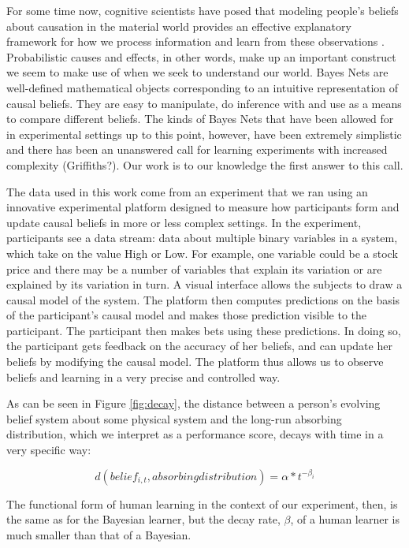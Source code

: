 For some time now, cognitive scientists have posed that modeling people's beliefs about causation in the material world provides an effective explanatory framework for how we process information and learn from these observations \cite{Griffiths2008}.  Probabilistic causes and effects, in other words, make up an important construct we seem to make use of when we seek to understand our world.  Bayes Nets are well-defined mathematical objects corresponding to an intuitive representation of causal beliefs.  They are easy to manipulate, do inference with and use as a means to compare different beliefs.  The kinds of Bayes Nets that have been allowed for in experimental settings up to this point, however, have been extremely simplistic and there has been an unanswered call for learning experiments with increased complexity (Griffiths?).  Our work is to our knowledge the first answer to this call.  

The data used in this work come from an experiment that we ran using an innovative experimental platform designed to measure how participants form and update causal beliefs in more or less complex settings.  In the experiment, participants see a data stream: data about multiple binary variables in a system, which take on the value High or Low. For example, one variable could be a stock price and there may be a number of variables that explain its variation or are explained by its variation in turn.  A visual interface allows the subjects to draw a causal model of the system. The platform then computes predictions on the basis of the participant's causal model and makes those prediction visible to the participant. The participant then makes bets using these predictions. In doing so, the participant gets feedback on the accuracy of her beliefs, and can update her beliefs by modifying the causal model. The platform thus allows us to observe beliefs and learning in a very precise and controlled way.

As can be seen in Figure \ref{fig:decay}, the distance between a person's evolving belief system about some physical system and the long-run absorbing distribution, which we interpret as a performance score, decays with time in a very specific way:

\begin{equation}
\label{ }
d(belief_{i, t}, absorbing distribution) = \alpha*t^{-\beta_i}
\end{equation}



The functional form of human learning in the context of our experiment, then, is the same as for the Bayesian learner, but the decay rate, $\beta$, of a human learner is much smaller than that of a Bayesian. 


